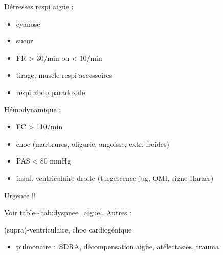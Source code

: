 \documentclass{book}
\begin{document}
Détresses respi aigüe :

\begin{itemize}
\item cyanose
\item sueur
\item FR > 30/min ou < 10/min
\item tirage, muscle respi accessoires
\item respi abdo paradoxale
\end{itemize}

Hémodynamique :

\begin{itemize}
\item FC > 110/min
\item choc (marbrures, oligurie, angoisse, extr. froides)
\item PAS < 80 mmHg
\item insuf. ventriculaire droite (turgescence jug, OMI, signe Harzer)
\end{itemize}

Urgence !!

Voir table\textasciitilde{}\ref{tab:dyspnee_aigue}. Autres :

(supra)-ventriculaire, choc cardiogénique
\begin{itemize}
\item pulmonaire : SDRA, décompensation aigüe, atélectasies, trauma
\end{itemize}
\end{document}
